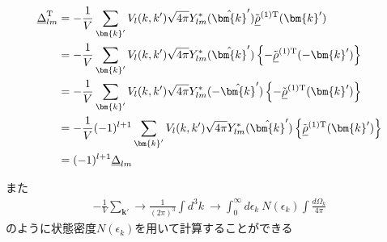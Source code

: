 \documentclass[dvipdfmx, 11pt, a4paper]{jsarticle}
\numberwithin{equation}{section}
\theoremstyle{definition}
\begin{document}
    \begin{derivationBox}
        \begin{align}
            \underline{\Delta}_{lm}^\mathrm{T}&= -\frac{1}{V}  \sum_{\bm{k}'} V_l(k,k') \sqrt{4\pi} Y_{lm}^*(\hat{\bm{k}}') \tilde{\underline{\rho}}^{(1)\mathrm{T}}(\bm{k}')  \notag \\
            &= -\frac{1}{V}  \sum_{\bm{k}'} V_l(k,k') \sqrt{4\pi} Y_{lm}^*(\hat{\bm{k}}')  \left\{ -\tilde{\underline{\rho}}^{(1)\mathrm{T}}(-\bm{k}') \right\} \notag \\
            &= -\frac{1}{V}  \sum_{\bm{k}'} V_l(k,k') \sqrt{4\pi} Y_{lm}^*(-\hat{\bm{k}}')  \left\{ -\tilde{\underline{\rho}}^{(1)\mathrm{T}}(\bm{k}') \right\} \notag \\
            &= -\frac{1}{V} (-1)^{l+1} \sum_{\bm{k}'} V_l(k,k') \sqrt{4\pi} Y_{lm}^*(\hat{\bm{k}}')  \left\{ \tilde{\underline{\rho}}^{(1)\mathrm{T}}(\bm{k}') \right\} \notag \\
            &= (-1)^{l+1} \underline{\Delta}_{lm}
        \end{align}
    \end{derivationBox}
    また
    \begin{align}
        -\frac{1}{V}  \sum_{\bm{k}'} \rightarrow \frac{1}{(2\pi)^3}\int d^3k\  \rightarrow \int_0^{\infty}d\epsilon_k\ N(\epsilon_k)\int\frac{d\Omega_k}{4\pi}
    \end{align}
    のように状態密度$N(\epsilon_k)$を用いて計算することができる
\end{document}
